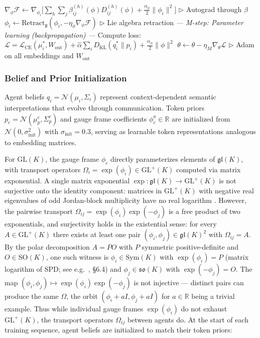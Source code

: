 \documentclass[twoside,11pt]{article}
\newcommand{\KL}{\operatorname{KL}}
\begin{document}
\begin{algorithm}[t]
\begin{algorithmic}[1]
  \STATE $\nabla_{\phi} \mathcal{F} \leftarrow \nabla_{\phi_i} \Big[\sum_h \sum_j \beta_{ij}^{(h)}(\phi) D_{ij}^{(h)}(\phi) + \tfrac{\alpha_\phi}{2}\|\phi_i\|^2\Big]$ \hfill $\triangleright$ Autograd through $\beta$
  \STATE $\phi_i \leftarrow \mathrm{Retract}_{\mathfrak{g}}(\phi_i, -\eta_\phi \nabla_\phi \mathcal{F})$ \hfill $\triangleright$ Lie algebra retraction
\ENDFOR
\STATE
\STATE \textit{--- M-step: Parameter learning (backpropagation) ---}
\STATE Compute loss: $\mathcal{L} = \mathcal{L}_{\text{CE}}(\mu_i^*, W_{\text{out}}) + \hat\alpha\sum_i D_{\KL}(q_i^* \| p_i) + \frac{\alpha_\phi}{2}\|\phi\|^2$
\STATE $\theta \leftarrow \theta - \eta_M \nabla_\theta \mathcal{L}$ \hfill $\triangleright$ Adam on all embeddings and $W_{\text{out}}$
\end{algorithmic}
\end{algorithm}

\subsubsection{Belief and Prior Initialization}

Agent beliefs $q_i = \mathcal{N}(\mu_i, \Sigma_i)$ represent context-dependent semantic interpretations that evolve through communication. Token priors $p_c = \mathcal{N}(\mu_p^c, \Sigma_p^c)$ and gauge frame coefficients $\phi_c^a \in \mathbb{R}$ are initialized from $\mathcal{N}(0, \sigma_{\text{init}}^2)$ with $\sigma_{\text{init}} = 0.3$, serving as learnable token representations analogous to embedding matrices.

For $\mathrm{GL}(K)$, the gauge frame $\phi_c$ directly parameterizes elements of $\mathfrak{gl}(K)$, with transport operators $\Omega_i = \exp(\phi_i) \in \mathrm{GL}^+(K)$ computed via matrix exponential. A single matrix exponential $\exp: \mathfrak{gl}(K) \to \mathrm{GL}^+(K)$ is not surjective onto the identity component: matrices in $\mathrm{GL}^+(K)$ with negative real eigenvalues of odd Jordan-block multiplicity have no real logarithm \citep{culver1966existence}. However, the pairwise transport $\Omega_{ij} = \exp(\phi_i)\exp(-\phi_j)$ is a free product of two exponentials, and surjectivity holds in the existential sense: for every $A \in \mathrm{GL}^+(K)$ there exists at least one pair $(\phi_i, \phi_j) \in \mathfrak{gl}(K)^2$ with $\Omega_{ij} = A$. By the polar decomposition $A = PO$ with $P$ symmetric positive-definite and $O \in \mathrm{SO}(K)$, one such witness is $\phi_i \in \mathrm{Sym}(K)$ with $\exp(\phi_i) = P$ (matrix logarithm of SPD; see e.g.~\citet{Higham2008}, \S6.4) and $\phi_j \in \mathfrak{so}(K)$ with $\exp(-\phi_j) = O$. The map $(\phi_i, \phi_j) \mapsto \exp(\phi_i)\exp(-\phi_j)$ is not injective --- distinct pairs can produce the same $\Omega$, the orbit $(\phi_i + aI, \phi_j + aI)$ for $a \in \mathbb{R}$ being a trivial example. Thus while individual gauge frames $\exp(\phi_i)$ do not exhaust $\mathrm{GL}^+(K)$, the transport operators $\Omega_{ij}$ between agents do. At the start of each training sequence, agent beliefs are initialized to match their token priors:
\end{document}
